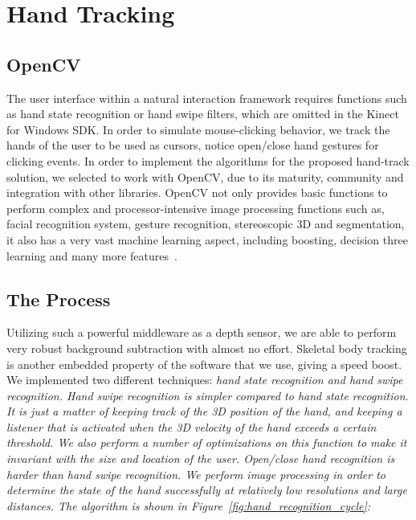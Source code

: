 \chapter{Hand Tracking}
\label{appendix_hand_tracking}

\section{OpenCV}
 
The user interface within a natural interaction framework requires functions such as hand state recognition or hand swipe filters, which are omitted in the Kinect for Windows SDK. In order to simulate mouse-clicking behavior, we track the hands of the user to be used as cursors, notice open/close hand gestures for clicking events. In order to implement the algorithms for the proposed hand-track solution, we selected to work with OpenCV, due to its maturity, community and integration with other libraries. OpenCV not only provides basic functions to perform complex and processor-intensive image processing functions such as, facial recognition system, gesture recognition, stereoscopic 3D and segmentation, it also has a very vast machine learning aspect, including boosting, decision three learning and many more features~\cite{opencv_library}.

\section{The Process}

Utilizing such a powerful middleware as a depth sensor, we are able to perform very robust background subtraction with almost no effort. Skeletal body tracking is another embedded property of the software that we use, giving a speed boost. We implemented two different techniques: \em{hand state recognition} and \em{hand swipe recognition}. Hand swipe recognition is simpler compared to hand state recognition. It is just a matter of keeping track of the 3D position of the hand, and keeping a listener that is activated when the 3D velocity of the hand exceeds a certain threshold. We also perform a number of optimizations on this function to make it invariant with the size and location of the user. Open/close hand recognition is harder than hand swipe recognition. We perform image processing in order to determine the state of the hand successfully at relatively low resolutions and large distances. The algorithm is shown in Figure~\ref{fig:hand_recognition_cycle}:

